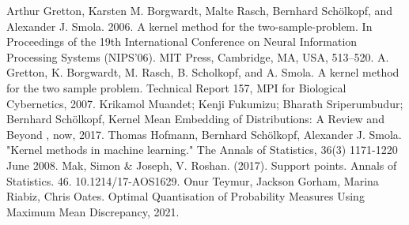 \documentclass[12pt]{article}
\begin{document}
\begin{thebibliography}{20}
 Arthur Gretton, Karsten M. Borgwardt, Malte Rasch, Bernhard Schölkopf, and Alexander J. Smola. 2006. A kernel method for the two-sample-problem. In Proceedings of the 19th International Conference on Neural Information Processing Systems (NIPS'06). MIT Press, Cambridge, MA, USA, 513–520.
 A. Gretton, K. Borgwardt, M. Rasch, B. Scholkopf, and A. Smola. A kernel method for the two sample
problem. Technical Report 157, MPI for Biological Cybernetics, 2007.
 Krikamol Muandet; Kenji Fukumizu; Bharath Sriperumbudur; Bernhard Schölkopf, Kernel Mean Embedding of Distributions: A Review and Beyond , now, 2017.
 Thomas Hofmann, Bernhard Schölkopf, Alexander J. Smola. "Kernel methods in machine learning." The Annals of Statistics, 36(3) 1171-1220 June 2008.
 Mak, Simon \& Joseph, V. Roshan. (2017). Support points. Annals of Statistics. 46. 10.1214/17-AOS1629. 
 Onur Teymur, Jackson Gorham, Marina Riabiz, Chris Oates. Optimal Quantisation of Probability Measures Using Maximum Mean Discrepancy, 2021. 
\end{thebibliography}
\end{document}
